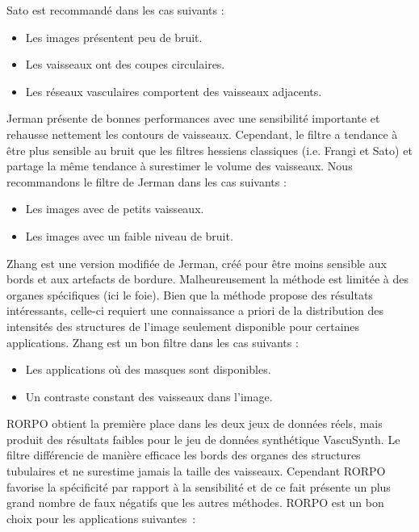 Sato est recommandé dans les cas suivants :

\begin{itemize}
  \item Les images présentent peu de bruit.
  \item Les vaisseaux ont des coupes circulaires.
  \item Les réseaux vasculaires comportent des vaisseaux adjacents.
\end{itemize}

Jerman présente de bonnes performances avec une sensibilité importante et rehausse nettement les contours de vaisseaux. Cependant, le filtre a tendance à être plus sensible au bruit que les filtres hessiens classiques (i.e. Frangi et Sato) et partage la même tendance à surestimer le volume des vaisseaux. Nous recommandons le filtre de Jerman dans les cas suivants : 

\begin{itemize}
\item Les images avec de petits vaisseaux.
\item Les images avec un faible niveau de bruit.
\end{itemize} 

Zhang est une version modifiée de Jerman, créé pour être moins sensible aux bords et aux artefacts de bordure. Malheureusement la méthode est limitée à des organes spécifiques (ici le  foie). Bien que la méthode propose des résultats intéressants, celle-ci requiert une connaissance a priori de la distribution des intensités des structures de l'image seulement disponible pour certaines applications. Zhang est un bon filtre dans les cas suivants :

\begin{itemize}
\item Les applications où des masques sont disponibles.
\item Un contraste constant des vaisseaux dans l'image.
\end{itemize}

RORPO obtient la première place dans les deux jeux de données réels, mais produit des résultats faibles pour le jeu de données synthétique VascuSynth. Le filtre différencie de manière efficace les bords des organes des structures tubulaires et ne surestime jamais la taille des vaisseaux. Cependant RORPO favorise la spécificité par rapport à la sensibilité et de ce fait présente un plus grand nombre de faux négatifs que les autres méthodes. RORPO est un bon choix pour les applications suivantes~:

